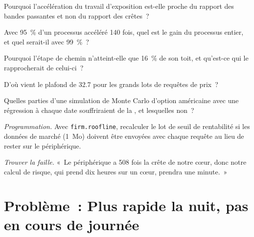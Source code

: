 \begin{exercise}[$\star$]\label{exo:pl:accelerators-for-quantitative-work:2}
Pourquoi l'accélération du travail d'exposition est-elle proche du rapport des bandes passantes et non du rapport des crêtes~?
\end{exercise}

\begin{exercise}[$\star$]\label{exo:pl:accelerators-for-quantitative-work:3}
Avec 95~\% d'un processus accéléré 140 fois, quel est le gain du processus entier, et quel serait-il avec 99~\%~?
\end{exercise}

\begin{exercise}[$\star\star$]\label{exo:pl:accelerators-for-quantitative-work:4}
Pourquoi l'étape de chemin n'atteint-elle que 16~\% de son toit, et qu'est-ce qui le rapprocherait de celui-ci~?
\end{exercise}

\begin{exercise}[$\star\star$]\label{exo:pl:accelerators-for-quantitative-work:5}
D'où vient le plafond de 32.7 pour les grands lots de requêtes de prix~?
\end{exercise}

\begin{exercise}[$\star\star$]\label{exo:pl:accelerators-for-quantitative-work:6}
Quelles parties d'une simulation de Monte Carlo d'option américaine avec une régression à chaque date souffriraient de la , et lesquelles non~?
\end{exercise}

\begin{exercise}[$\star\star\star$]\label{exo:pl:accelerators-for-quantitative-work:7}
\emph{Programmation.} Avec \texttt{firm.roofline}, recalculer le lot de seuil de rentabilité si les données de marché (1~Mo) doivent être envoyées avec chaque requête au lieu
de rester sur le périphérique.
\end{exercise}

\begin{exercise}[$\star\star\star$]\label{exo:pl:accelerators-for-quantitative-work:8}
\emph{Trouver la faille.} «~Le périphérique a 508 fois la crête de notre cœur, donc notre calcul de risque, qui prend dix heures sur un cœur, prendra une minute.~»
\end{exercise}

\section{Problème~: Plus rapide la nuit, pas en cours de journée}

